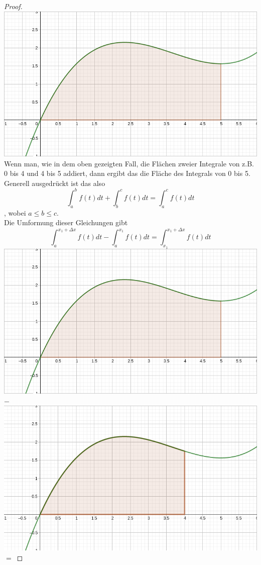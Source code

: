 \documentclass[fontsize=12pt,paper=a4,DIV12,cleardoublepage=empty, 
liststotoc,idxtotoc,bibtotoc]{article}
\theoremstyle{plain}
\theoremstyle{definition}
\begin{document}
\begin{proof}
		\includegraphics[scale=0.2]{Integral 0-5.png} \\
		Wenn man, wie in dem oben gezeigten Fall, die Flächen zweier Integrale von z.B. 0 bis 4 und 4 bis 5 addiert, dann ergibt das die Fläche des Integrals von 0 bis 5. Generell ausgedrückt ist das also
		\begin{equation*}
			\int_{a}^{b}f(t)dt + \int_{b}^{c}f(t)dt = \int_{a}^{c}f(t)dt
		\end{equation*}
		, wobei $a\leq b\leq c$.\\
		Die Umformung dieser Gleichungen gibt
		\begin{equation*}
			\int_{a}^{x_1+\Delta x}f(t)dt-\int_{a}^{x_1}f(t)dt=\int_{x_1}^{x_1+\Delta x}f(t)dt
		\end{equation*}
		\includegraphics[scale=0.2]{Integral 0-5.png} $-$
		\includegraphics[scale=0.2]{Integral 0-4.png} $=$

\end{proof}
\end{document}
